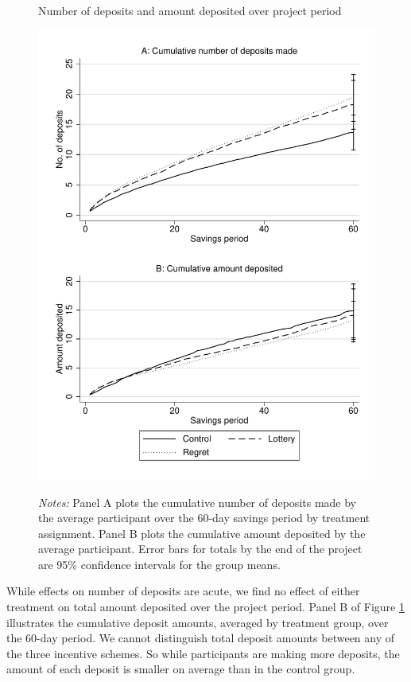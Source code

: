 \documentclass[11pt]{article}
\begin{document}

		

		\begin{figure}[ht]
			\caption{Number of deposits and amount deposited over project period}
			\includegraphics[height=0.85\textheight]{../../figures/line-cumdeposits.pdf}
			\label{fig:line-cumdeposits}
			\caption*{\footnotesize \emph{Notes:} Panel A plots the cumulative number of deposits made by the average participant over the 60-day savings period by treatment assignment. Panel B plots the cumulative amount deposited by the average participant. Error bars for totals by the end of the project are 95\% confidence intervals for the group means.}
		\end{figure}

		\clearpage

		While effects on number of deposits are acute, we find no effect of either treatment on total amount deposited over the project period. Panel B of Figure \ref{fig:line-cumdeposits} illustrates the cumulative deposit amounts, averaged by treatment group, over the 60-day period. We cannot distinguish total deposit amounts between any of the three incentive schemes. So while participants are making more deposits, the amount of each deposit is smaller on average than in the control group.
\end{document}
